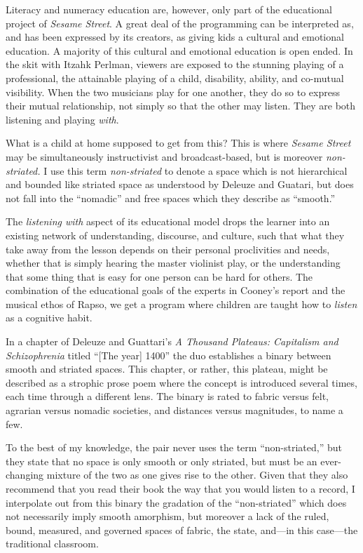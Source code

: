 \documentclass[12pt,letterpaper]{article}
\begin{document}
	Literacy and numeracy education are, however, only part of the 
	educational project of \textit{Sesame Street}. A great deal of the 
	programming can be interpreted as, and has been expressed by its 
	creators, as giving kids a cultural and emotional 
	education.\autocite[297]{Ostrofsky2012}
	A majority of this cultural and emotional education is open ended. 
	In the skit with Itzahk Perlman, viewers are exposed to the stunning 
	playing of a professional, the attainable playing of a child, 
	disability, ability, and co-mutual visibility. When the two musicians 
	play for one another, they do so to express their mutual relationship, 
	not simply so that the other may listen. They are both listening and 
	playing \textit{with}. 

	What is a child at home supposed to get from this? This is where 
	\textit{Sesame Street} may be simultaneously instructivist and 
	broadcast-based, but 
	is moreover \textit{non-striated.} I use this term 
	\textit{non-striated} to denote a space which is not
	hierarchical and bounded like striated space as understood by Deleuze 
	and Guatari, but does not fall into the ``nomadic'' and free spaces 
	which they describe as ``smooth.'' 

	The \textit{listening with} aspect of its 
	educational model drops the learner into an existing network of 
	understanding, discourse, and culture, such that what they take away
	from the lesson depends on their personal proclivities and needs, 
	whether that is simply hearing the master violinist play, or the 
	understanding that some thing that is easy for one person can be hard 
	for others. The combination of the educational goals of the experts
	in Cooney's report and the musical ethos of Rapso, we get a program 
	where children are taught how to \textit{listen} as a cognitive habit. 

	In a chapter of Deleuze and Guattari's \textit{A Thousand Plateaus: 
	Capitalism and Schizophrenia} titled ``[The year] 1400'' the duo 
	establishes a binary between smooth and striated spaces. This chapter, 
	or rather, this
	plateau, might be described as a strophic prose poem where the concept 
	is introduced several times, each time through a different lens. The 
	binary 
	is rated to fabric versus felt,	agrarian versus nomadic societies, and 
	distances versus magnitudes, to name a few.   

	To the best of my knowledge, the pair never uses the term 
	``non-striated,'' but they state that no space is only smooth or 
	only striated, but must be an ever-changing mixture of the two as one 
	gives rise to the other.\autocite[474]{Deleuze} Given that they also 
	recommend that you read their book the way that you would listen to a 
	record,\autocite[ix]{Deleuze} I interpolate out from this binary the 
	gradation of the ``non-striated'' which does not necessarily 
	imply smooth amorphism, but moreover a lack of the ruled, bound, 
	measured, and governed spaces of fabric, the state, and---in this 
	case---the traditional classroom.       
\end{document}

